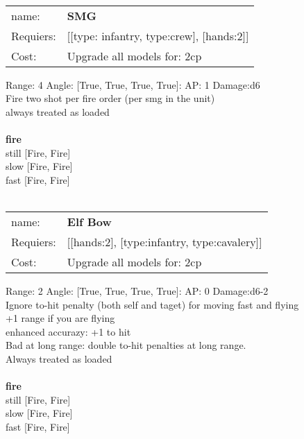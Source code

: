 \ \\
\begin{tabular}{ll}
name: & {\bf SMG } \\
Requiers: & [[type: infantry, type:crew], [hands:2]] \\
Cost: & Upgrade all models for: 2cp \\
\end{tabular}



Range: 4  Angle: [True, True, True, True]: AP: 1 Damage:d6 \\
Fire two shot per fire order (per smg in the unit)\\ 
always treated as loaded\\ 







\ \\ {\bf fire } \\
still [Fire, Fire] \\
slow [Fire, Fire] \\
fast [Fire, Fire] \\

\ \\
\begin{tabular}{ll}
name: & {\bf Elf Bow } \\
Requiers: & [[hands:2], [type:infantry, type:cavalery]] \\
Cost: & Upgrade all models for: 2cp \\
\end{tabular}



Range: 2  Angle: [True, True, True, True]: AP: 0 Damage:d6-2 \\
Ignore to-hit penalty (both self and taget) for moving fast and flying\\ 
+1 range if you are flying\\ 
enhanced accurazy: +1 to hit\\ 
Bad at long range: double to-hit penalties at long range.\\ 
Always treated as loaded\\ 







\ \\ {\bf fire } \\
still [Fire, Fire] \\
slow [Fire, Fire] \\
fast [Fire, Fire] \\


